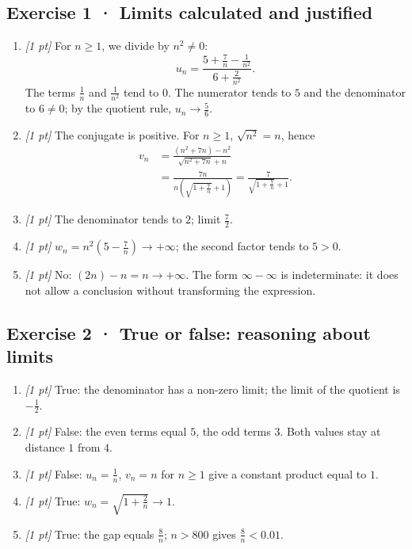 \subsection*{Exercise 1 · Limits calculated and justified}\begin{enumerate}

\item \textit{[1 pt]} For $n\ge1$, we divide by $n^2\ne0$:
\[u_n=\frac{5+\frac{7}{n}-\frac{1}{n^2}}{6+\frac{2}{n^2}}.\]
The terms $\frac{1}{n}$ and $\frac{1}{n^2}$ tend to $0$. The numerator tends to $5$ and the denominator to $6\ne0$; by the quotient rule, $u_n\to\frac{5}{6}$.

\item \textit{[1 pt]} The conjugate is positive. For $n\ge1$, $\sqrt{n^2}=n$, hence
\[\begin{aligned}v_n&=\frac{(n^2+7n)-n^2}{\sqrt{n^2+7n}+n}\\&=\frac{7n}{n(\sqrt{1+\frac{7}{n}}+1)}=\frac{7}{\sqrt{1+\frac{7}{n}}+1}.\end{aligned}\]

\item \textit{[1 pt]} The denominator tends to $2$; limit $\frac{7}{2}$.

\item \textit{[1 pt]} $w_n=n^2(5-\frac{7}{n})\to+\infty$; the second factor tends to $5>0$.

\item \textit{[1 pt]} No: $(2n)-n=n\to+\infty$. The form $\infty-\infty$ is indeterminate: it does not allow a conclusion without transforming the expression.

\end{enumerate}

\subsection*{Exercise 2 · True or false: reasoning about limits}\begin{enumerate}

\item \textit{[1 pt]} True: the denominator has a non-zero limit; the limit of the quotient is $-\frac{1}{2}$.

\item \textit{[1 pt]} False: the even terms equal $5$, the odd terms $3$. Both values stay at distance $1$ from $4$.

\item \textit{[1 pt]} False: $u_n=\frac{1}{n}$, $v_n=n$ for $n\ge1$ give a constant product equal to $1$.

\item \textit{[1 pt]} True: $w_n=\sqrt{1+\frac{2}{n}}\to1$.

\item \textit{[1 pt]} True: the gap equals $\frac{8}{n}$; $n>800$ gives $\frac{8}{n}<\num{0,01}$.

\end{enumerate}

